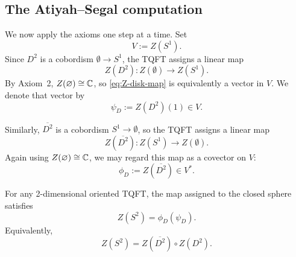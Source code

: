 \subsection{The Atiyah--Segal computation}

We now apply the axioms one step at a time. Set
\begin{equation}\label{eq:V-ZS1}
V := Z(S^1).
\end{equation}
Since $D^2$ is a cobordism $\emptyset \to S^1$, the TQFT assigns a linear map
\begin{equation}\label{eq:Z-disk-map}
Z(D^2) : Z(\emptyset) \longrightarrow Z(S^1).
\end{equation}
By Axiom~2, $Z(\varnothing) \cong \mathbb{C}$, so \eqref{eq:Z-disk-map} is equivalently a vector in $V$. We denote that vector by
\begin{equation}\label{eq:psi-disk}
\psi_{D} := Z(D^2)(1) \in V.
\end{equation}

\noindent Similarly, $\overline{D^2}$ is a cobordism $S^1 \to \emptyset$, so the TQFT assigns a linear map
\begin{equation}\label{eq:Z-opposite-disk-map}
Z(\overline{D^2}) : Z(S^1) \longrightarrow Z(\emptyset).
\end{equation}
Again using $Z(\varnothing) \cong \mathbb{C}$, we may regard this map as a covector on $V$:
\begin{equation}\label{eq:phi-opposite-disk}
\phi_{D} := Z(\overline{D^2}) \in V^*.
\end{equation}

\begin{proposition}\label{prop:sphere-from-disk-gluing}
For any 2-dimensional oriented TQFT, the map assigned to the closed sphere satisfies
\begin{equation}\label{eq:ZS2-pairing}
Z(S^2) = \phi_D(\psi_D).
\end{equation}
Equivalently,
\begin{equation}\label{eq:ZS2-composition}
Z(S^2) = Z(\overline{D^2}) \circ Z(D^2).
\end{equation}
\end{proposition}

